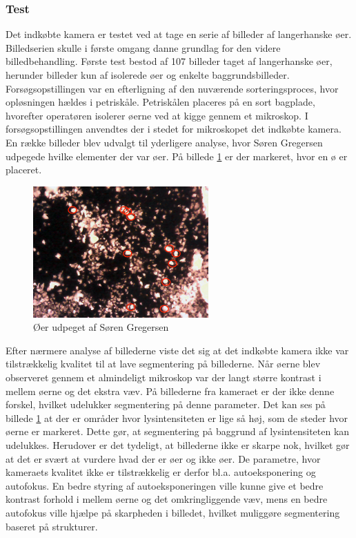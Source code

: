 \subsubsection{Test}
Det indkøbte kamera er testet ved at tage en serie af billeder af langerhanske øer. Billedserien skulle i første omgang danne grundlag for den videre billedbehandling. Første test bestod af 107 billeder taget af langerhanske øer, herunder billeder kun af isolerede øer og enkelte baggrundsbilleder. Forsøgsopstillingen var en efterligning af den nuværende sorteringsproces, hvor opløsningen hældes i petriskåle. Petriskålen placeres på en sort bagplade, hvorefter operatøren isolerer øerne ved at kigge gennem et mikroskop. I forsøgsopstillingen anvendtes der i stedet for mikroskopet det indkøbte kamera. En række billeder blev udvalgt til yderligere analyse, hvor Søren Gregersen udpegede hvilke elementer der var øer. På billede \ref{fig:isletSG} er der markeret, hvor en ø er placeret.

\begin{figure}[H]
	\centering
	\includegraphics[width=0.6\textwidth]{billeder/software/sgbillede.png}
	\caption{Øer udpeget af Søren Gregersen}
	\label{fig:isletSG}
\end{figure}

Efter nærmere analyse af billederne viste det sig at det indkøbte kamera ikke var tilstrækkelig kvalitet til at lave segmentering på billederne. Når øerne blev observeret gennem et almindeligt mikroskop var der langt større kontrast i mellem øerne og det ekstra væv. På billederne fra kameraet er der ikke denne forskel, hvilket udelukker segmentering på denne parameter. Det kan ses på billede \ref{fig:isletSG} at der er områder hvor lysintensiteten er lige så høj, som de steder hvor øerne er markeret. Dette gør, at segmentering på baggrund af lysintensiteten kan udelukkes. Herudover er det tydeligt, at billederne ikke er skarpe nok, hvilket gør at det er svært at vurdere hvad der er øer og ikke øer. De parametre, hvor kameraets kvalitet ikke er tilstrækkelig er derfor bl.a. autoeksponering og autofokus. En bedre styring af autoeksponeringen ville kunne give et bedre kontrast forhold i mellem øerne og det omkringliggende væv, mens en bedre autofokus ville hjælpe på skarpheden i billedet, hvilket muliggøre segmentering baseret på strukturer.

